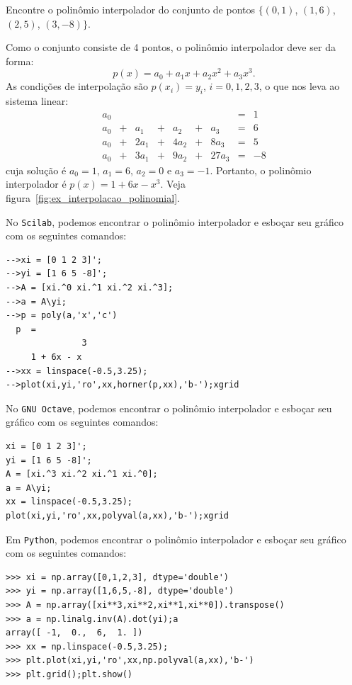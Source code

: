 \begin{ex}\label{ex:interpolacao_polinomial} Encontre o polinômio interpolador do conjunto de pontos $\{(0, 1)$, $(1, 6)$, $(2, 5)$, $(3, -8)\}$.
\end{ex}
\begin{sol}
Como o conjunto consiste de 4 pontos, o polinômio interpolador deve ser da forma:
\begin{equation*}
  p(x) = a_0 + a_1x + a_2x^2 + a_3x^3.
\end{equation*}
As condições de interpolação são $p(x_i) = y_i$, $i = 0, 1, 2, 3$, o que nos leva ao sistema linear:
\begin{equation*}
  \begin{array}{lclclclcl}
    a_0& & & & & & &=&1\\
    a_0&+& a_1&+& a_2&+&  a_3&=&6\\
    a_0&+&2a_1&+&4a_2&+& 8a_3&=&5\\
    a_0&+&3a_1&+&9a_2&+&27a_3&=&-8
  \end{array}
\end{equation*}
cuja solução é $a_0=1$, $a_1=6$, $a_2=0$ e $a_3=-1$. Portanto, o polinômio interpolador é $p(x)=1+6x-x^3$. Veja figura~\ref{fig:ex_interpolacao_polinomial}.

\ifisscilab
No \verb+Scilab+, podemos encontrar o polinômio interpolador e esboçar seu gráfico com os seguintes comandos:
\begin{verbatim}
-->xi = [0 1 2 3]';
-->yi = [1 6 5 -8]'; 
-->A = [xi.^0 xi.^1 xi.^2 xi.^3];
-->a = A\yi; 
-->p = poly(a,'x','c') 
  p  =
               3
     1 + 6x - x   
-->xx = linspace(-0.5,3.25); 
-->plot(xi,yi,'ro',xx,horner(p,xx),'b-');xgrid
\end{verbatim}
\fi
\ifisoctave
No \verb+GNU Octave+, podemos encontrar o polinômio interpolador e esboçar seu gráfico com os seguintes comandos:
\begin{verbatim}
xi = [0 1 2 3]';
yi = [1 6 5 -8]'; 
A = [xi.^3 xi.^2 xi.^1 xi.^0];
a = A\yi; 
xx = linspace(-0.5,3.25); 
plot(xi,yi,'ro',xx,polyval(a,xx),'b-');xgrid
\end{verbatim}
\fi
\ifispython
Em \verb+Python+, podemos encontrar o polinômio interpolador e esboçar seu gráfico com os seguintes comandos:
\begin{verbatim}
>>> xi = np.array([0,1,2,3], dtype='double')
>>> yi = np.array([1,6,5,-8], dtype='double')
>>> A = np.array([xi**3,xi**2,xi**1,xi**0]).transpose()
>>> a = np.linalg.inv(A).dot(yi);a
array([ -1,  0.,  6,  1. ])
>>> xx = np.linspace(-0.5,3.25); 
>>> plt.plot(xi,yi,'ro',xx,np.polyval(a,xx),'b-')
>>> plt.grid();plt.show()
\end{verbatim}
\fi
\end{sol}


